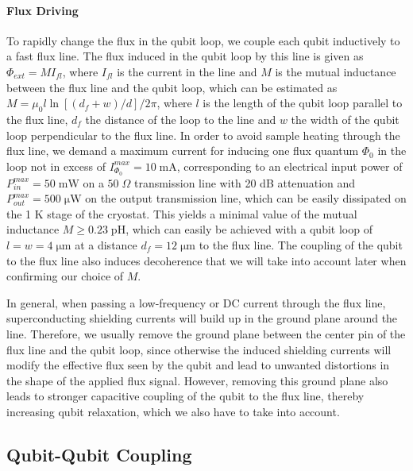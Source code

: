 \paragraph{Flux Driving}

To rapidly change the flux in the qubit loop, we couple each qubit inductively to a fast flux line. The flux induced in the qubit loop by this line is given as $\Phi_{ext}=M I_{fl}$, where $I_{fl}$ is the current in the line and $M$ is the mutual inductance between the flux line and the qubit loop, which can be estimated as $M=\mu_0 l \ln{\left[(d_f+w)/d\right]}/2\pi$, where $l$ is the length of the qubit loop parallel to the flux line, $d_f$ the distance of the loop to the line and $w$ the width of the qubit loop perpendicular to the flux line. In order to avoid sample heating through the flux line, we demand a maximum current for inducing one flux quantum $\Phi_0$ in the loop not in excess of $I_{\Phi_0}^{max}=10\;\mathrm{mA}$, corresponding to an electrical input power of $P^{max}_{in}=50\;\mathrm{mW}$ on a $50 \; \Omega$ transmission line with 20 dB attenuation and $P^{max}_{out}=500\;\mathrm{\mu W}$ on the output transmission line, which can be easily dissipated on the 1 K stage of the cryostat. This yields a minimal value of the mutual inductance $M\ge 0.23\;\mathrm{pH}$, which can easily be achieved with a qubit loop of $l=w=4\;\mathrm{\mu m}$ at a distance $d_f=12\;\mathrm{\mu m}$ to the flux line. The coupling of the qubit to the flux line also induces decoherence that we will take into account later when confirming our choice of $M$.

\smallskip

In general, when passing a low-frequency or DC current through the flux line, superconducting shielding currents will build up in the ground plane around the line. Therefore, we usually remove the ground plane between the center pin of the flux line and the qubit loop, since otherwise the induced shielding currents will modify the effective flux seen by the qubit and lead to unwanted distortions in the shape of the applied flux signal. However, removing this ground plane also leads to stronger capacitive coupling of the qubit to the flux line, thereby increasing qubit relaxation, which we also have to take into account.

\subsection{Qubit-Qubit Coupling} \label{section:qubit_qubit_coupling}

